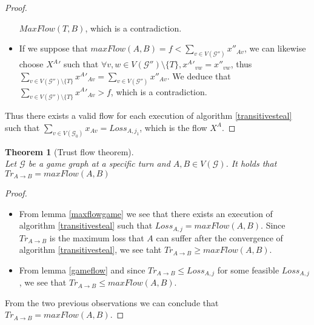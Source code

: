 \documentclass[11pt]{article}
\newtheorem{theorem}{Theorem}[section]
\theoremstyle{definition}
\theoremstyle{corollary}
\theoremstyle{lemma}
\begin{document}
\begin{proof}
\begin{itemize}
          $MaxFlow(T, B)$, which is a contradiction.
          \item If we suppose that $maxFlow(A, B) = f < \sum\limits_{v \in V(\mathcal{G}'')}x''_{Av}$, we can likewise choose
          ${X^A}'$ such that $\forall v, w \in V(\mathcal{G}'') \setminus \{T\}, {x^A}'_{vw} = x''_{vw}$, thus
          $\sum\limits_{v \in V(\mathcal{G}'') \setminus \{T\}}{x^A}'_{Av} = \sum\limits_{v \in V(\mathcal{G}'')}x''_{Av}$.
          We deduce that $\sum\limits_{v \in V(\mathcal{G}'') \setminus \{T\}}{x^A}'_{Av} > f$, which is a contradiction.
       \end{itemize}
       Thus there exists a valid flow for each execution of algorithm \ref{transitivesteal} such that $\sum\limits_{v \in
       V(\mathcal{G}_0)}x_{Av} = Loss_{A, j_1}$, which is the flow $X^A$.
    \end{proof}
    \begin{theorem}[Trust flow theorem] \ \\
       \label{trustflow}
       Let $\mathcal{G}$ be a game graph at a specific turn and $A, B \in V(\mathcal{G})$. It holds that
       $Tr_{A \rightarrow B} = maxFlow(A, B)$
    \end{theorem}
    \begin{proof} \
       \begin{itemize} 
          \item From lemma \ref{maxflowgame} we see that there exists an execution of algorithm \ref{transitivesteal} such
          that $Loss_{A, j} = maxFlow(A, B)$. Since $Tr_{A \rightarrow B}$ is the maximum loss that $A$ can suffer after the
          convergence of algorithm \ref{transitivesteal}, we see taht $Tr_{A \rightarrow B} \geq maxFlow(A, B)$.
          \item From lemma \ref{gameflow} and since $Tr_{A \rightarrow B} \leq Loss_{A, j}$ for some feasible $Loss_{A, j}$,
          we see that $Tr_{A \rightarrow B} \leq maxFlow(A, B)$.
       \end{itemize}
       From the two previous observations we can conclude that $Tr_{A \rightarrow B} = maxFlow(A, B)$.
    \end{proof}
\end{document}

